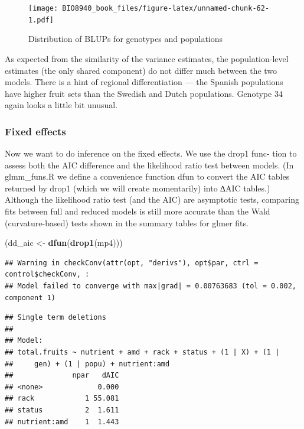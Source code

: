 \documentclass[
  12pt,
]{book}
\newenvironment{Shaded}{\begin{snugshade}}{\end{snugshade}}
\newcommand{\KeywordTok}[1]{\textcolor[rgb]{0.13,0.29,0.53}{\textbf{#1}}}
\newcommand{\NormalTok}[1]{#1}
\newcommand{\StringTok}[1]{\textcolor[rgb]{0.31,0.60,0.02}{#1}}
\begin{document}
\begin{figure}
\centering
\texttt{[image: BIO8940\_book\_files/figure-latex/unnamed-chunk-62-1.pdf]}
\caption{\label{fig:unnamed-chunk-62}Distribution of BLUPs for genotypes and populations}
\end{figure}

As expected from the similarity of the variance estimates, the population-level estimates (the only shared component) do not differ much between the two models. There is a hint of regional differentiation --- the Spanish populations have higher fruit sets than the Swedish and Dutch populations. Genotype 34 again looks a little bit unusual.

\hypertarget{fixed-effects}{%
\subsubsection{Fixed effects}\label{fixed-effects}}

Now we want to do inference on the fixed effects. We use the drop1 func- tion to assess both the AIC difference and the likelihood ratio test between models. (In glmm\_funs.R we define a convenience function dfun to convert the AIC tables returned by drop1 (which we will create momentarily) into ∆AIC tables.) Although the likelihood ratio test (and the AIC) are asymptotic tests, comparing fits between full and reduced models is still more accurate than the Wald (curvature-based) tests shown in the summary tables for glmer fits.

\begin{Shaded}
\begin{Highlighting}[]
\NormalTok{(dd_aic <-}\StringTok{ }\KeywordTok{dfun}\NormalTok{(}\KeywordTok{drop1}\NormalTok{(mp4)))}
\end{Highlighting}
\end{Shaded}

\begin{verbatim}
## Warning in checkConv(attr(opt, "derivs"), opt$par, ctrl = control$checkConv, :
## Model failed to converge with max|grad| = 0.00763683 (tol = 0.002, component 1)
\end{verbatim}

\begin{verbatim}
## Single term deletions
## 
## Model:
## total.fruits ~ nutrient + amd + rack + status + (1 | X) + (1 | 
##     gen) + (1 | popu) + nutrient:amd
##              npar   dAIC
## <none>             0.000
## rack            1 55.081
## status          2  1.611
## nutrient:amd    1  1.443
\end{verbatim}
\end{document}
